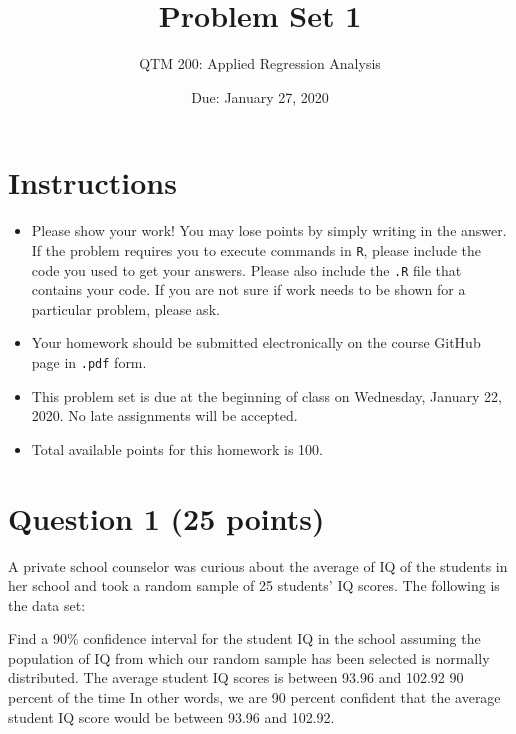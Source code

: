 \documentclass[12pt,letterpaper]{article}
\title{Problem Set 1}
\date{Due: January 27, 2020}
\author{QTM 200: Applied Regression Analysis}
\begin{document}
	\maketitle
	
	\section*{Instructions}
	\begin{itemize}
		\item Please show your work! You may lose points by simply writing in the answer. If the problem requires you to execute commands in \texttt{R}, please include the code you used to get your answers. Please also include the \texttt{.R} file that contains your code. If you are not sure if work needs to be shown for a particular problem, please ask.
		\item Your homework should be submitted electronically on the course GitHub page in \texttt{.pdf} form.
		\item This problem set is due at the beginning of class on Wednesday, January 22, 2020. No late assignments will be accepted.
		\item Total available points for this homework is 100.
	\end{itemize}
	
	\vspace{1cm}
	\section*{Question 1 (25 points)}

A private school counselor was curious about the average of IQ of the students in her school and took a random sample of 25 students' IQ scores. The following is the data set:
\vspace{.5cm}

  

\vspace{.5cm}

\noindent Find a 90\% confidence interval for the student IQ in the school assuming the population of IQ from which our random sample has been selected is normally distributed. 
The average student IQ scores is between 93.96 and 102.92 90 percent of the time
In other words, we are 90 percent confident that the average student IQ score would be between 93.96 and 102.92.
\vspace{1cm}
\end{document}
